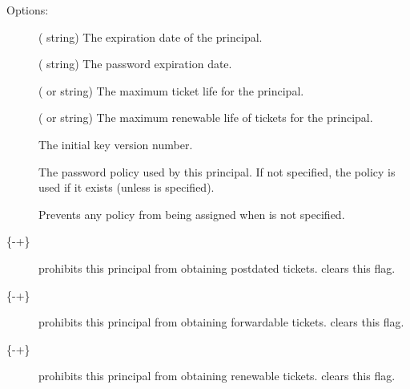 \documentclass[letterpaper,10pt,english]{sphinxmanual}
\begin{document}
Options:
\begin{description}
\item[{ }] \leavevmode
( string) The expiration date of the principal.

\item[{ }] \leavevmode
( string) The password expiration date.

\item[{ }] \leavevmode
( or  string) The maximum ticket life
for the principal.

\item[{ }] \leavevmode
( or  string) The maximum renewable
life of tickets for the principal.

\item[{ }] \leavevmode
The initial key version number.

\item[{ }] \leavevmode
The password policy used by this principal.  If not specified, the
policy  is used if it exists (unless 
is specified).

\item[{}] \leavevmode
Prevents any policy from being assigned when  is not
specified.

\item[{\{-\textbar{}+\}}] \leavevmode
{} prohibits this principal from obtaining
postdated tickets.   clears this flag.

\item[{\{-\textbar{}+\}}] \leavevmode
{} prohibits this principal from obtaining
forwardable tickets.   clears this flag.

\item[{\{-\textbar{}+\}}] \leavevmode
{} prohibits this principal from obtaining
renewable tickets.   clears this flag.


\end{description}
\end{document}
